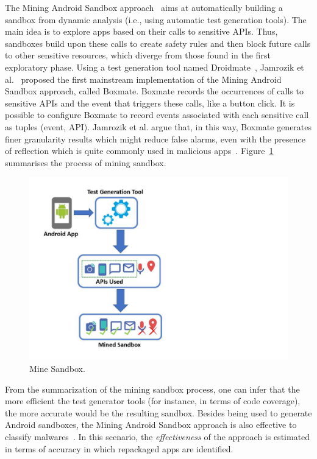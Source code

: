 The Mining Android Sandbox approach~\cite{DBLP:conf/icse/JamrozikSZ16} aims at automatically
building a sandbox from dynamic analysis (i.e., using automatic test generation tools).
The main idea is to explore apps based on their calls to sensitive APIs.
Thus, sandboxes build upon these calls to create safety rules and then block future
calls to other sensitive resources, which diverge from those found in the first exploratory
phase. Using a test generation tool named Droidmate~\cite{DBLP:conf/icse/JamrozikZ16},
Jamrozik et al.~\cite{DBLP:conf/icse/JamrozikSZ16} proposed the first mainstream
implementation of the Mining Android Sandbox approach, called Boxmate. 
Boxmate records the occurrences of calls to sensitive APIs and the event that triggers these calls,
like a button click. It is possible to configure Boxmate to record events associated with each sensitive call as
tuples (event, API). Jamrozik et al. argue that, in this way, Boxmate generates finer granularity results which
might reduce false alarms, even with the presence of reflection which is quite commonly used in
malicious apps~\cite{DBLP:conf/issta/0029BOK16}. Figure~\ref{fig:mineSandbox}  summarises the process of mining sandbox. 

\begin{figure}[ht]
\centering
\includegraphics[scale=0.35]{images/mineSandbox_.pdf}
\caption{Mine Sandbox.}
 \label{fig:mineSandbox}
\end{figure}

From the summarization of the mining sandbox process, one can infer that the more efficient the test generator
tools (for instance, in terms of code coverage), the more accurate would be the resulting
sandbox. Besides being used to generate Android sandboxes, the Mining Android Sandbox approach is also effective 
to classify malwares~\cite{DBLP:conf/wcre/BaoLL18}.  In this scenario, the \emph{effectiveness} of the approach
is estimated in terms of accuracy in which repackaged apps are identified.


